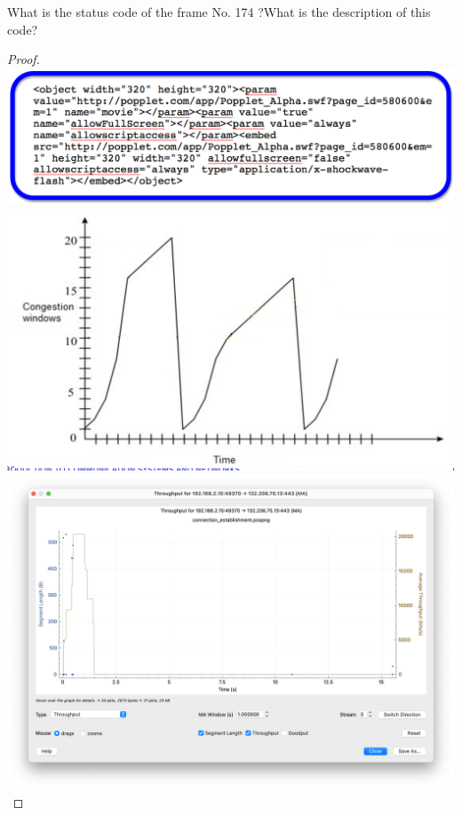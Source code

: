 \documentclass[../../main.tex]{subfiles}
\begin{document}
\begin{wts}
What is the status code of the frame No. 174 ?What is the description of this code? 
\end{wts}
\begin{proof}
\includegraphics[width=\textwidth]{subfiles/images/L5_Manual/L5N2_ DNS & HTTP_PAGE30_14_Image181.png}
\includegraphics[width=\textwidth]{subfiles/images/part3_q19_window_graphic.png}
\includegraphics[width=\textwidth]{subfiles/images/throughput_Q15_client_to_server.png}
\end{proof}
\end{document}
